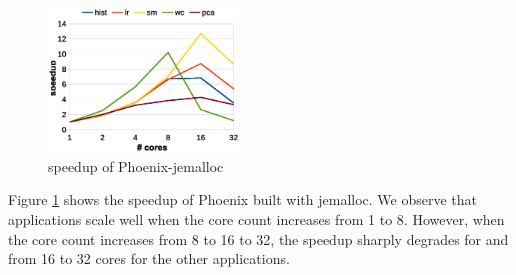 \begin{figure}[!h!t]  
	\centering
	\includegraphics[width=0.45\textwidth]{eps/phoenix_speedup_jemalloc.eps}
	\caption{speedup of Phoenix-jemalloc}
	\label{fig:phoenix:speedup:jemalloc}
\end{figure}




Figure \ref{fig:phoenix:speedup:jemalloc} shows the speedup of Phoenix built with jemalloc.
We observe that applications scale well when the core count increases from 1 to 8.
However, when the core count increases from 8 to 16 to 32, the speedup sharply degrades for  and from 16 to 32 cores for the other applications.



